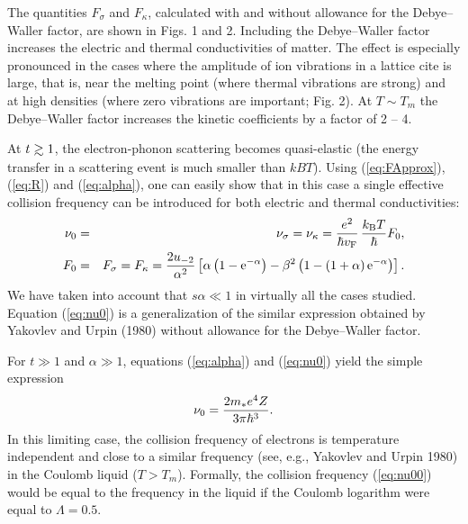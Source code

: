 The quantities $F_\sigma$ and $F_\kappa$, calculated with and without
allowance for the Debye--Waller factor, are shown in Figs. 1 and 2.
Including the Debye--Waller factor increases the electric
and thermal conductivities of matter. The effect is especially
pronounced in the cases where the amplitude of ion vibrations in a
lattice cite is large, that is, near the melting point (where
thermal vibrations are strong) and at high densities  (where zero
vibrations are important; Fig. 2). At $T \sim T_m$ the Debye--Waller
factor increases the kinetic coefficients by a factor of 2 -- 4.

At $t \ga 1$, the electron-phonon scattering becomes quasi-elastic
(the energy transfer in a scattering event is much smaller
than $kB T$). Using (\ref{eq:FApprox}), (\ref{eq:R}) and 
(\ref{eq:alpha}), one can easily show that in
this case a single effective collision frequency can be introduced
for both electric and thermal conductivities:
%
\begin{eqnarray}
      \nu_0 & = & \nu_{\sigma} = \nu_{\kappa} =
          { e^2 \over \hbar \mbox{$v_{\rm F}$}} \, {\mbox{$k_{\rm B}$} T \over \hbar} F_0,
\nonumber \\
      F_0 & = & F_{\sigma} = F_{\kappa} = {2u_{-2} \over \alpha^2}
            \left[ \alpha \left(1 - {\rm e}^{-\alpha} \right)
            - \beta^2 \left(1 - (1+\alpha) \, {\rm e}^{-\alpha}
            \right) \right].
\label{eq:nu0}
\end{eqnarray}
%
We have taken into account that $s \alpha \ll 1$ in virtually
all the cases studied. Equation (\ref{eq:nu0}) is a generalization 
of the similar expression obtained by Yakovlev and Urpin (1980) without
allowance for the Debye--Waller factor.

For $t \gg 1$ and $\alpha \gg 1$, equations (\ref{eq:alpha}) and 
(\ref{eq:nu0}) yield the simple expression
%
\begin{equation}
    \nu_0 = {2 m_\ast e^4Z \over 3 \pi \hbar^3}.
\label{eq:nu00}
\end{equation}
%
In this limiting case, the collision frequency of electrons 
is temperature independent and close to a similar frequency
(see, e.g., Yakovlev and Urpin 1980) in the Coulomb liquid
($T > T_m$). Formally, the collision frequency (\ref{eq:nu00}) 
would be equal to the frequency in the liquid if the Coulomb 
logarithm were equal to $\Lambda = 0.5$.

